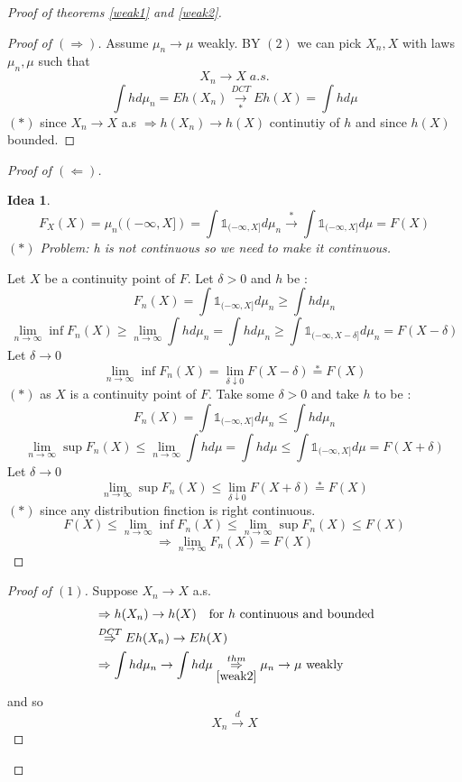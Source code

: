 \documentclass[12pt]{article}
\newtheorem*{idea}{Idea}
\begin{document}
\begin{proof}[Proof of theorems \ref{weak1} and \ref{weak2}]
\begin{proof}[Proof of $(\Rightarrow)$]
Assume $\mu_n \rightarrow \mu$ weakly. BY $(2)$ we can pick $X_n,X$ with laws $\mu_n, \mu$ such that
\[X_n \rightarrow X \; a.s.\]
\[\int h d\mu_n = Eh(X_n) \underset{*}{\overset{DCT}{\rightarrow}} Eh(X) = \int h d\mu\]
$(*)$  since $X_n \rightarrow X$ a.s $\Rightarrow h(X_n)\rightarrow h(X)$ continutiy of $h$ and since $h(X)$ bounded. 
\end{proof}
\begin{proof}[Proof of $(\Leftarrow)$]
\begin{idea}
\[F_X(X) = \mu_n((-\infty, X]) = \int{\mathbb 1}_{(-\infty, X]}d\mu_n \overset{*}{\rightarrow} \int{\mathbb 1}_{(-\infty, X]}d\mu = F(X)\]
$(*)$ Problem: h is not continuous so we need to make it continuous.
\end{idea}
Let $X$ be a continuity point of $F$. Let $\delta >0$ and $h$ be :
\[F_n(X) =  \int{\mathbb 1}_{(-\infty, X]}d\mu_n \geq \int hd\mu_n \]
\[\lim\limits_{n\rightarrow \infty}\inf F_n(X) \geq \lim_{n\rightarrow \infty} \int h d\mu_n =  \int h d\mu_n \geq \int{\mathbb 1}_{(-\infty, X-\delta]}d\mu_n  = F(X-\delta) \]
Let $\delta \rightarrow  0$ 
\[\lim\limits_{n\rightarrow \infty}\inf F_n(X)  = \lim\limits_{\delta \downarrow 0}F(X-\delta) \overset{*}{=} F(X)\]
$(*)$ as $X$ is a continuity point of $F$. 
Take some $\delta >0$ and take $h$ to be :
\[F_n(X) = \int{\mathbb 1}_{(-\infty,X]}d\mu_n \leq \int h d\mu_n\]
\[\lim\limits_{n \rightarrow \infty}\sup F_n(X) \leq \lim\limits_{n \rightarrow \infty} \int h d\mu = \int h d\mu \leq  \int{\mathbb 1}_{(-\infty,X]}d\mu = F(X+\delta)\]
Let $\delta \rightarrow 0$
\[\lim\limits_{n \rightarrow \infty}\sup F_n(X) \leq \lim\limits_{\delta \downarrow 0} F(X+\delta) \overset{*}{=} F(X)\]
$(*)$ since any distribution finction is right continuous.
\[F(X) \leq \lim\limits_{n \rightarrow \infty} \inf F_n(X) \leq \lim\limits_{n\rightarrow \infty} \sup F_n(X) \leq F(X) \]
\[\Rightarrow \lim\limits_{n \rightarrow \infty} F_n(X) = F(X)\]
\end{proof}
\begin{proof}[Proof of $(1)$]
Suppose $X_n \rightarrow X$ a.s.
\begin{align*}
&\Rightarrow h(X_n)\rightarrow h(X) \quad \text{for $h$ continuous and bounded}\\
&\overset{DCT}{\Rightarrow} Eh(X_n) \rightarrow Eh(X)\\
&\Rightarrow \int h d\mu_n \rightarrow \int h d \mu \underset{\ref{weak2}}{\overset{thm}{\Rightarrow}} \mu_n \rightarrow \mu \text{ weakly}\end{align*}
and so 
\[X_n \overset{d}{\rightarrow} X\]
\end{proof}
\end{proof}
\end{document}
